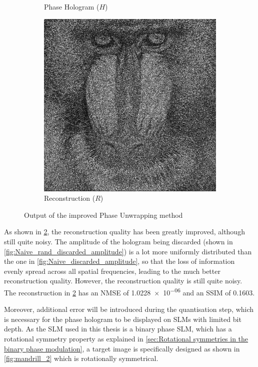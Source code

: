\begin{figure}[H]
\begin{subfigure}[t]{0.3\textwidth}
    \caption{Phase Hologram ($H$)}
    \label{fig:Naive_rand_holo}
  \end{subfigure}
  \hfill
  \begin{subfigure}[t]{0.3\textwidth}
    \centering
    \includegraphics[width=\textwidth]{Naive_rand_recon.png}
    \caption{Reconstruction ($R$)}
    \label{fig:Naive_rand_recon}
  \end{subfigure}
  \caption{Output of the improved Phase Unwrapping method}
  \label{fig:Output of the improved Naive method}
\end{figure}

As shown in \cref{fig:Naive_rand_recon}, the reconstruction quality has been greatly improved, although still quite noisy. The amplitude of the hologram being discarded (shown in \cref{fig:Naive_rand_discarded_amplitude}) is a lot more uniformly distributed than the one in \cref{fig:Naive_discarded_amplitude}, so that the loss of information evenly spread across all spatial frequencies, leading to the much better reconstruction quality. However, the reconstruction quality is still quite noisy. The reconstruction in \cref{fig:Naive_rand_recon} has an NMSE of \num{1.0228e-06} and an SSIM of 0.1603.

Moreover, additional error will be introduced during the quantisation step, which is necessary for the phase hologram to be displayed on SLMs with limited bit depth. As the SLM used in this thesis is a binary phase SLM, which has a rotational symmetry property as explained in \cref{sec:Rotational symmetries in the binary phase modulation}, a target image is specifically designed as shown in \cref{fig:mandrill_2} which is rotationally symmetrical.

